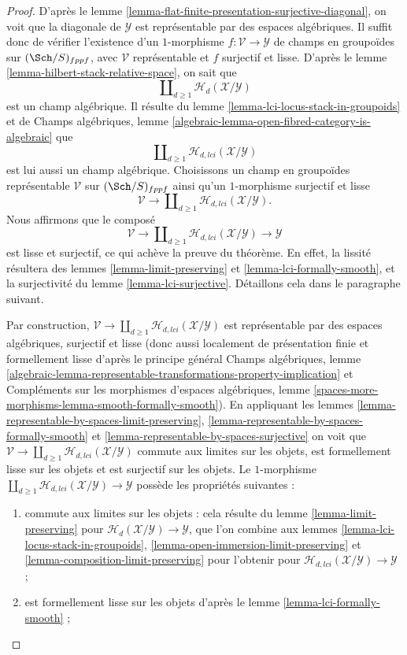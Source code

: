 \begin{proof}
D'après le
lemme \ref{lemma-flat-finite-presentation-surjective-diagonal},
on voit que la diagonale de $\mathcal{Y}$ est représentable par des espaces
algébriques. Il suffit donc de vérifier l'existence d'un $1$-morphisme
$f : \mathcal{V} \to \mathcal{Y}$ de champs en groupoïdes sur
$(\Sch/S)_{fppf}$, avec $\mathcal{V}$ représentable et
$f$ surjectif et lisse. D'après le
lemme \ref{lemma-hilbert-stack-relative-space},
on sait que
$$
\coprod\nolimits_{d \geq 1} \mathcal{H}_d(\mathcal{X}/\mathcal{Y})
$$
est un champ algébrique. Il résulte du
lemme \ref{lemma-lci-locus-stack-in-groupoids}
et de
Champs algébriques,
lemme \ref{algebraic-lemma-open-fibred-category-is-algebraic}
que
$$
\coprod\nolimits_{d \geq 1} \mathcal{H}_{d, lci}(\mathcal{X}/\mathcal{Y})
$$
est lui aussi un champ algébrique. Choisissons un champ en groupoïdes représentable
$\mathcal{V}$ sur $(\Sch/S)_{fppf}$ ainsi qu'un
$1$-morphisme surjectif et lisse
$$
\mathcal{V}
\longrightarrow
\coprod\nolimits_{d \geq 1} \mathcal{H}_{d, lci}(\mathcal{X}/\mathcal{Y}).
$$
Nous affirmons que le composé
$$
\mathcal{V}
\longrightarrow
\coprod\nolimits_{d \geq 1} \mathcal{H}_{d, lci}(\mathcal{X}/\mathcal{Y})
\longrightarrow
\mathcal{Y}
$$
est lisse et surjectif, ce qui achève la preuve du théorème. En effet,
la lissité résultera des
lemmes \ref{lemma-limit-preserving} et \ref{lemma-lci-formally-smooth},
et la surjectivité du
lemme \ref{lemma-lci-surjective}.
Détaillons cela dans le paragraphe suivant.

\medskip\noindent
Par construction, $\mathcal{V} \to
\coprod\nolimits_{d \geq 1} \mathcal{H}_{d, lci}(\mathcal{X}/\mathcal{Y})$
est représentable par des espaces algébriques, surjectif et lisse (donc
aussi localement de présentation finie et formellement lisse d'après le principe
général
Champs algébriques, lemme
\ref{algebraic-lemma-representable-transformations-property-implication}
et
Compléments sur les morphismes d'espaces algébriques,
lemme \ref{spaces-more-morphisms-lemma-smooth-formally-smooth}).
En appliquant les
lemmes \ref{lemma-representable-by-spaces-limit-preserving},
\ref{lemma-representable-by-spaces-formally-smooth} et
\ref{lemma-representable-by-spaces-surjective}
on voit que $\mathcal{V} \to
\coprod\nolimits_{d \geq 1} \mathcal{H}_{d, lci}(\mathcal{X}/\mathcal{Y})$
commute aux limites sur les objets, est formellement lisse sur les objets et
est surjectif sur les objets. Le $1$-morphisme
$\coprod\nolimits_{d \geq 1} \mathcal{H}_{d, lci}(\mathcal{X}/\mathcal{Y})
\to \mathcal{Y}$ possède les propriétés suivantes :
\begin{enumerate}
\item commute aux limites sur les objets : cela résulte du
lemme \ref{lemma-limit-preserving}
pour $\mathcal{H}_d(\mathcal{X}/\mathcal{Y}) \to \mathcal{Y}$,
que l'on combine aux lemmes
\ref{lemma-lci-locus-stack-in-groupoids},
\ref{lemma-open-immersion-limit-preserving} et
\ref{lemma-composition-limit-preserving}
pour l'obtenir pour $\mathcal{H}_{d, lci}(\mathcal{X}/\mathcal{Y}) \to \mathcal{Y}$ ;
\item est formellement lisse sur les objets d'après le
lemme \ref{lemma-lci-formally-smooth} ;


\end{enumerate}
\end{proof}
